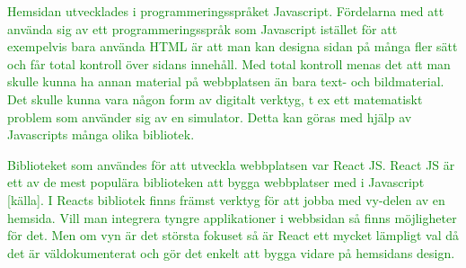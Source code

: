 \textcolor{green}{Hemsidan utvecklades i programmeringsspråket Javascript. Fördelarna med att använda sig av ett programmeringsspråk som Javascript istället för att exempelvis bara använda HTML är att man kan designa sidan på många fler sätt och får total kontroll över sidans innehåll. Med total kontroll menas det att man skulle kunna ha annan material på webbplatsen än bara text- och bildmaterial. Det skulle kunna vara någon form av digitalt verktyg, t ex ett matematiskt problem som använder sig av en simulator. Detta kan göras med hjälp av Javascripts många olika bibliotek.}

\textcolor{green}{Biblioteket som användes för att utveckla webbplatsen var React JS. React JS är ett av de mest populära biblioteken att bygga webbplatser med i Javascript [källa]. I Reacts bibliotek finns främst verktyg för att jobba med vy-delen av en hemsida. Vill man integrera tyngre applikationer i webbsidan så finns möjligheter för det. Men om vyn är det största fokuset så är React ett mycket lämpligt val då det är väldokumenterat och gör det enkelt att bygga vidare på hemsidans design.}
